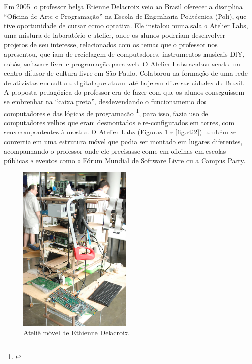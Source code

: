 Em 2005, o professor belga Etienne Delacroix veio ao Brasil oferecer a disciplina ``Oficina de Arte e Programação'' na Escola de Engenharia Politécnica (Poli), que tive oportunidade de cursar como optativa. Ele instalou numa sala o Atelier Labs, uma mistura de laboratório e atelier, onde os alunos poderiam desenvolver projetos de seu interesse, relacionados com os temas que o professor nos apresentou, que iam de reciclagem de computadores, instrumentos musicais DIY, robôs, software livre e programação para web. O Atelier Labs acabou sendo um  centro difusor de cultura livre em São Paulo. Colaborou na formação de uma rede de ativistas em cultura digital que atuam até hoje em diversas cidades do Brasil. A proposta pedagógica do professor era de fazer com que os alunos conseguissem se embrenhar na ``caixa preta'', desdevendando o funcionamento dos computadores e das lógicas de programação \footnote{\cite{Delacroix2009}}, para isso, fazia uso de computadores velhos que eram desmontados e re-configurados em torres, com seus compontentes à mostra. O Atelier Labs (Figuras \ref{fig:eti} e \ref{fig:eti2}) também se convertia em uma estrutura móvel que podia ser montado em lugares diferentes, acompanhando o professor onde ele precisasse como em oficinas em escolas públicas e eventos como o Fórum Mundial de Software Livre ou a Campus Party.

\begin{figure}

\includegraphics[width=0.5\textwidth]{pictures/cap1/eti1}
\caption{Ateliê móvel de Ethienne Delacroix.}
\label{fig:eti}
\end{figure}

